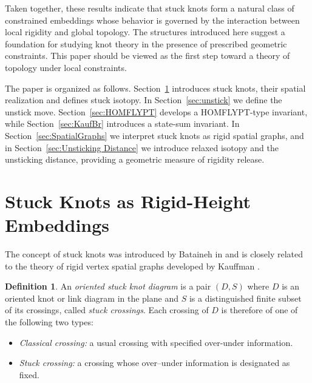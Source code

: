 \documentclass[11pt,a4paper]{article}
\theoremstyle{plain}
\theoremstyle{definition}
\newtheorem{definition}[theorem]{Definition}
\begin{document}
\medskip

Taken together, these results indicate that stuck knots form a natural class of constrained embeddings whose behavior is governed by the interaction between local rigidity and global topology. The structures introduced here suggest a foundation for studying knot theory in the presence of prescribed geometric constraints. This paper should be viewed as the first step toward a theory of topology under local constraints.

\medskip

The paper is organized as follows. Section~\ref{sec:StuckKnots} introduces stuck knots, their spatial realization and defines stuck isotopy. In Section~\ref{sec:unstick} we define the unstick move. Section~\ref{sec:HOMFLYPT} develops a HOMFLYPT-type invariant, while Section~\ref{sec:KaufBr} introduces a state-sum invariant. In Section~\ref{sec:SpatialGraphs} we interpret stuck knots as rigid spatial graphs, and in Section~\ref{sec:Unsticking Distance} we introduce relaxed isotopy and the unsticking distance, providing a geometric measure of rigidity release.


 





\section{Stuck Knots as Rigid-Height Embeddings}\label{sec:StuckKnots}

The concept of stuck knots was introduced by Bataineh in \cite{Bataineh2020} and is closely related to the theory of rigid vertex spatial graphs developed by Kauffman \cite{Kauffman1989}. 


\begin{definition}\label{def:stucKnots}
An \emph{oriented stuck knot diagram} is a pair $(D,S)$ where $D$ is an oriented knot or link diagram in the plane and $S$ is a distinguished finite subset of its crossings, called \emph{stuck crossings}. Each crossing of $D$ is therefore of one of the following two types:

\begin{itemize}
\item \emph{Classical crossing:} a usual crossing with specified over-under information.

\item \emph{Stuck crossing:} a crossing whose over–under information is designated as fixed.
\end{itemize}
\end{definition}
\end{document}
